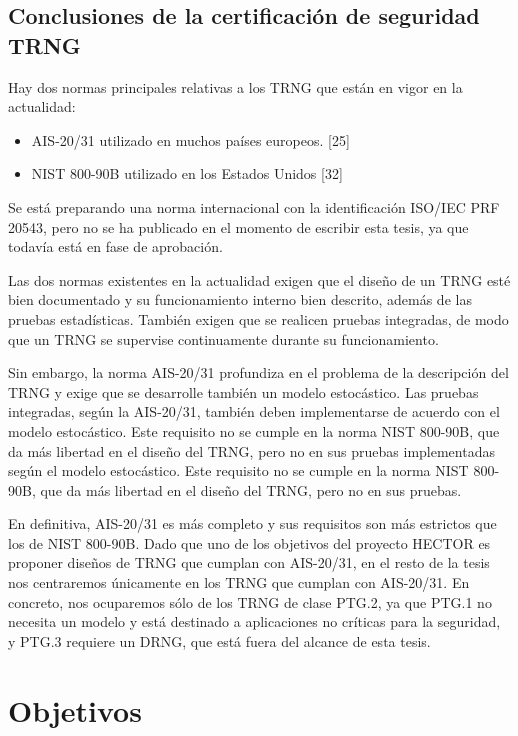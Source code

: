 		\subsection{Conclusiones de la certificación de seguridad TRNG}
		
		Hay dos normas principales relativas a los TRNG que están en vigor en la actualidad:
		
		\begin{itemize}[noitemsep]
			\item AIS-20/31 utilizado en muchos países europeos. [25]
			\item NIST 800-90B utilizado en los Estados Unidos [32]
		\end{itemize}
	
	Se está preparando una norma internacional con la identificación ISO/IEC PRF 20543, pero no se ha publicado en el momento de escribir esta tesis, ya que todavía está en fase de aprobación.
	
	Las dos normas existentes en la actualidad exigen que el diseño de un TRNG esté bien documentado y su funcionamiento interno bien descrito, además de las pruebas estadísticas. También exigen que se realicen pruebas integradas, de modo que un TRNG se supervise continuamente durante su funcionamiento.
	
	Sin embargo, la norma AIS-20/31 profundiza en el problema de la descripción del TRNG y exige que se desarrolle también un modelo estocástico. Las pruebas integradas, según la AIS-20/31, también deben implementarse de acuerdo con el modelo estocástico. Este requisito no se cumple en la norma NIST 800-90B, que da más libertad en el diseño del TRNG, pero no en sus pruebas implementadas según el modelo estocástico. Este requisito no se cumple en la norma NIST 800-90B, que da más libertad en el diseño del TRNG, pero no en sus pruebas.
	
	En definitiva, AIS-20/31 es más completo y sus requisitos son más estrictos que los de NIST 800-90B. Dado que uno de los objetivos del proyecto HECTOR es proponer diseños de TRNG que cumplan con AIS-20/31, en el resto de la tesis nos centraremos únicamente en los TRNG que cumplan con AIS-20/31. En concreto, nos ocuparemos sólo de los TRNG de clase PTG.2, ya que PTG.1 no necesita un modelo y está destinado a aplicaciones no críticas para la seguridad, y PTG.3 requiere un DRNG, que está fuera del alcance de esta tesis.	
	
	\section{Objetivos}
	
